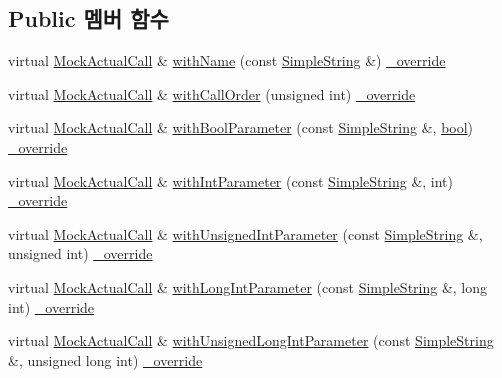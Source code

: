 \subsection*{Public 멤버 함수}
\begin{DoxyCompactItemize}
\item 
virtual \hyperlink{class_mock_actual_call}{Mock\+Actual\+Call} \& \hyperlink{class_mock_ignored_actual_call_a7f4d2dc54eded00a8ea8cb32c4c102ac}{with\+Name} (const \hyperlink{class_simple_string}{Simple\+String} \&) \hyperlink{_cpp_u_test_config_8h_a049bea15dd750e15869863c94c1efc3b}{\+\_\+override}
\item 
virtual \hyperlink{class_mock_actual_call}{Mock\+Actual\+Call} \& \hyperlink{class_mock_ignored_actual_call_a5f7af17ecf58c5c7e6aa775564a33466}{with\+Call\+Order} (unsigned int) \hyperlink{_cpp_u_test_config_8h_a049bea15dd750e15869863c94c1efc3b}{\+\_\+override}
\item 
virtual \hyperlink{class_mock_actual_call}{Mock\+Actual\+Call} \& \hyperlink{class_mock_ignored_actual_call_a46157c69c123a1204af66b2e98564b75}{with\+Bool\+Parameter} (const \hyperlink{class_simple_string}{Simple\+String} \&, \hyperlink{avb__gptp_8h_af6a258d8f3ee5206d682d799316314b1}{bool}) \hyperlink{_cpp_u_test_config_8h_a049bea15dd750e15869863c94c1efc3b}{\+\_\+override}
\item 
virtual \hyperlink{class_mock_actual_call}{Mock\+Actual\+Call} \& \hyperlink{class_mock_ignored_actual_call_accf35ee1cf1468ecb976e0520f06652c}{with\+Int\+Parameter} (const \hyperlink{class_simple_string}{Simple\+String} \&, int) \hyperlink{_cpp_u_test_config_8h_a049bea15dd750e15869863c94c1efc3b}{\+\_\+override}
\item 
virtual \hyperlink{class_mock_actual_call}{Mock\+Actual\+Call} \& \hyperlink{class_mock_ignored_actual_call_a56a4a33b9560f505bdc42a569f0cdfdd}{with\+Unsigned\+Int\+Parameter} (const \hyperlink{class_simple_string}{Simple\+String} \&, unsigned int) \hyperlink{_cpp_u_test_config_8h_a049bea15dd750e15869863c94c1efc3b}{\+\_\+override}
\item 
virtual \hyperlink{class_mock_actual_call}{Mock\+Actual\+Call} \& \hyperlink{class_mock_ignored_actual_call_a4d6905cce41d5f7618fcbc710ddcbfbb}{with\+Long\+Int\+Parameter} (const \hyperlink{class_simple_string}{Simple\+String} \&, long int) \hyperlink{_cpp_u_test_config_8h_a049bea15dd750e15869863c94c1efc3b}{\+\_\+override}
\item 
virtual \hyperlink{class_mock_actual_call}{Mock\+Actual\+Call} \& \hyperlink{class_mock_ignored_actual_call_a763fd9dcb0be7674382fa1f8f3ae6451}{with\+Unsigned\+Long\+Int\+Parameter} (const \hyperlink{class_simple_string}{Simple\+String} \&, unsigned long int) \hyperlink{_cpp_u_test_config_8h_a049bea15dd750e15869863c94c1efc3b}{\+\_\+override}

\end{DoxyCompactItemize}
